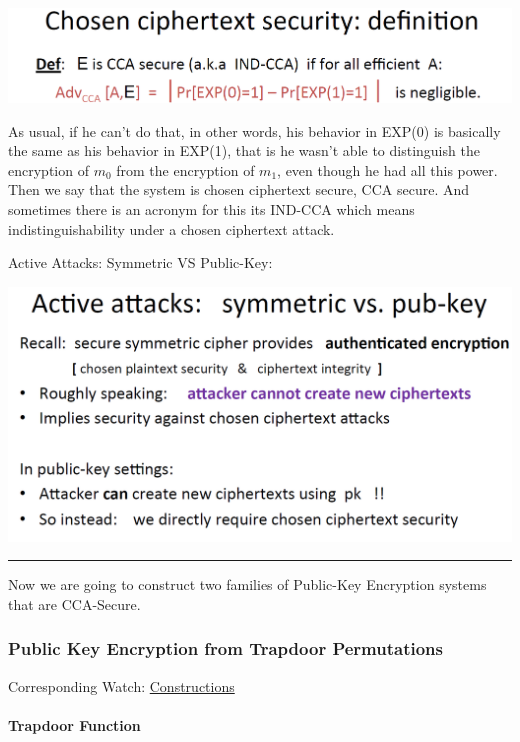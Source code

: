 \documentclass[11pt]{article}
\makeatletter
\def\maxwidth{\ifdim\Gin@nat@width>\linewidth\linewidth
    \else\Gin@nat@width\fi}
\let\Oldincludegraphics\includegraphics
\renewcommand{\includegraphics}[1]{\Oldincludegraphics[width=.8\maxwidth]{#1}}
\makeatother
\begin{document}
\includegraphics{./Images/PKEnc-CCASecureDef.png}

As usual, if he can't do that, in other words, his behavior in EXP(0) is
basically the same as his behavior in EXP(1), that is he wasn't able to
distinguish the encryption of \(m_{0}\) from the encryption of
\(m_{1}\), even though he had all this power. Then we say that the
system is chosen ciphertext secure, CCA secure. And sometimes there is
an acronym for this its IND-CCA which means indistinguishability under a
chosen ciphertext attack.

Active Attacks: Symmetric VS Public-Key:

\includegraphics{./Images/ActiveAttack-SymVsPKEnc.png}

\begin{center}\rule{0.5\linewidth}{\linethickness}\end{center}

    Now we are going to construct two families of Public-Key Encryption
systems that are CCA-Secure.

\hypertarget{public-key-encryption-from-trapdoor-permutations}{%
\subsubsection{Public Key Encryption from Trapdoor
Permutations}\label{public-key-encryption-from-trapdoor-permutations}}

Corresponding Watch:
\href{https://www.coursera.org/learn/crypto/lecture/nTRhL/constructions}{Constructions}

\hypertarget{trapdoor-function}{%
\paragraph{Trapdoor Function}\label{trapdoor-function}}
\end{document}
